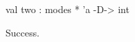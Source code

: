 \chklistingtrue
{}
\begin{ChkListingMsg}
val two : modes * 'a -D-> int
\end{ChkListingMsg}
\begin{ChkListingErr}
Success.
\end{ChkListingErr}
